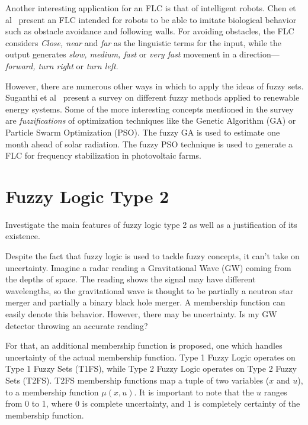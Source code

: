 \documentclass[titlepage, letterpaper, fleqn]{article}
\newcommand{\spacepls}{\vspace{5mm}}
\begin{document}
Another interesting application for an FLC is that of intelligent robots.
Chen et al~\cite{Chen17} present an FLC intended for robots to be able to imitate biological behavior such as obstacle avoidance and following walls.
For avoiding obstacles, the FLC considers \textit{Close, near} and \textit{far} as the linguistic terms for the input, while the output generates \textit{slow, medium, fast} or \textit{very fast} movement in a direction---\textit{forward, turn right} or \textit{turn left}.

However, there are numerous other ways in which to apply the ideas of fuzzy sets.
Suganthi et al~\cite{Suganthi15} present a survey on different fuzzy methods applied to renewable energy systems.
Some of the more interesting concepts mentioned in the survey are \textit{fuzzifications} of optimization techniques like the Genetic Algorithm (GA) or Particle Swarm Optimization (PSO).
The fuzzy GA is used to estimate one month ahead of solar radiation.
The fuzzy PSO technique is used to generate a FLC for frequency stabilization in photovoltaic farms.

\section{Fuzzy Logic Type 2}

{\large Investigate the main features of fuzzy logic type 2 as well as a justification of its existence.}

\spacepls

Despite the fact that fuzzy logic is used to tackle fuzzy concepts, it can't take on uncertainty.
Imagine a radar reading a Gravitational Wave (GW) coming from the depths of space. The reading shows the signal may have different wavelengths, so the gravitational wave is thought to be partially a neutron star merger and partially a binary black hole merger.
A membership function can easily denote this behavior.
However, there may be uncertainty. Is my GW detector throwing an accurate reading?

For that, an additional membership function is proposed, one which handles uncertainty of the actual membership function.
Type 1 Fuzzy Logic operates on Type 1 Fuzzy Sets (T1FS), while Type 2 Fuzzy Logic operates on Type 2 Fuzzy Sets (T2FS).
T2FS membership functions map a tuple of two variables ($x$ and $u$), to a membership function $\mu(x,u)$.
It is important to note that the $u$ ranges from 0 to 1, where 0 is complete uncertainty, and 1 is completely certainty of the membership function.
\end{document}
